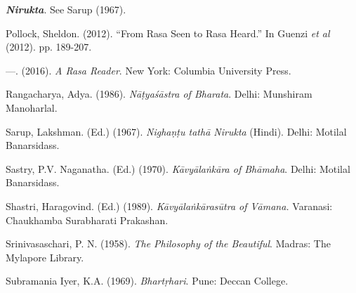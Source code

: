\begin{thebibliography}{99}
  \textit{\textbf{Nirukta}}. See Sarup (1967).

  Pollock, Sheldon. (2012). “From Rasa Seen to Rasa Heard.” In Guenzi \textit{et al} (2012). pp. 189-207.

  —. (2016). \textit{A Rasa Reader}. New York: Columbia University Press.

  Rangacharya, Adya. (1986). \textit{Nāṭyaśāstra of Bharata}. Delhi: Munshiram Manoharlal.

  Sarup, Lakshman. (Ed.) (1967). \textit{Nighaṇṭu tathā Nirukta} (Hindi). Delhi: Motilal Banarsidass.

  Sastry, P.V. Naganatha. (Ed.) (1970).\textit{ Kāvyālaṅkāra of Bhāmaha}. Delhi: Motilal Banarsidass.

  Shastri, Haragovind. (Ed.) (1989). \textit{Kāvyālaṅkārasūtra of Vāmana.} Varanasi: Chaukhamba Surabharati Prakashan.

  Srinivasaschari, P. N. (1958). \textit{The Philosophy of the Beautiful}. Madras: The Mylapore Library.

  Subramania Iyer, K.A. (1969). \textit{Bhartṛhari}. Pune: Deccan College.

 \end{thebibliography}

\label{chapter9-end}
